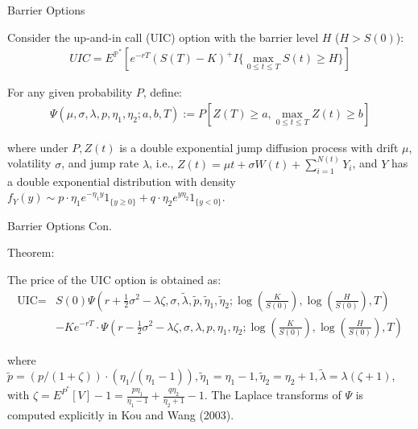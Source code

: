\documentclass{beamer}
\begin{document}
\begin{frame}{Barrier Options}


    {\footnotesize \footnotesize
    \par Consider the up-and-in call (UIC) option with the barrier level $H$ ($H>S(0)$):
    \vspace{1em}
    \begin{align*}
        UIC = E^{\mathbb{P}^*}[e^{-rT}(S(T) - K)^+I{\{ \max\limits_{0 \leq t \leq T} S(t) \geq H \}}]
    \end{align*}
    \vspace{1em}
    \par  \pause For any given probability \( P \), define:
    \vspace{1em}
    \begin{align*}
        \Psi(\mu, \sigma, \lambda, p, \eta_1, \eta_2; a, b, T):= P[Z(T) \geq a, \max_{0 \leq t \leq T} Z(t) \geq b]
    \end{align*}
    \vspace{1em}
    \par  \pause where under \( P, Z(t) \) is a double exponential jump diffusion 
    process with drift \( \mu \), volatility \( \sigma \), and jump rate \( \lambda \), i.e., \( Z(t) = \mu t + \sigma W(t) + \sum_{i=1}^{N(t)} Y_i \), 
    and \( Y \) has a double exponential distribution with 
    density \( f_Y(y) \sim p \cdot \eta_1 e^{-\eta_1 y} 1_{\{y \geq 0\}} + q \cdot \eta_2 e^{y \eta_2} 1_{\{y < 0\}} \).
    }
    
    
\end{frame}
\begin{frame}{Barrier Options Con.}

    \par Theorem:
    \vspace{1em}
    {\footnotesize \footnotesize
    
    \par The price of the UIC option is obtained as:
    \vspace{1em}
    \begin{align*}
        \text{UIC} = & S(0) \Psi \left( r + \frac{1}{2} \sigma^2 - \lambda \zeta, \sigma, \tilde{\lambda}, \tilde{p}, \tilde{\eta}_1, \tilde{\eta}_2; \right. 
        \left. \log \left( \frac{K}{S(0)} \right), \log \left( \frac{H}{S(0)} \right), T \right) \\
        & -Ke^{-rT} \cdot \Psi \left( r - \frac{1}{2} \sigma^2 - \lambda \zeta, \sigma, \lambda, p, \eta_1, \eta_2; \right. 
         \left. \log \left( \frac{K}{S(0)} \right), \log \left( \frac{H}{S(0)} \right), T \right)
    \end{align*}
    \vspace{1em}
    \par  \pause where \( \tilde{p} = (p/(1 + \zeta)) \cdot (\eta_1 / (\eta_1 - 1)), \tilde{\eta}_1 
    = \eta_1 - 1, \tilde{\eta}_2 = \eta_2 + 1, \tilde{\lambda} = \lambda(\zeta + 1) \), 
    with \(\zeta = E^{P^*}[V] - 1 = \frac{p\eta_{1}}{\eta_{1}-1} + \frac{q\eta_{2}}{\eta_{2}+1} - 1\). 
    The Laplace transforms of \( \Psi \) is computed explicitly in Kou and Wang (2003).
    }
    
\end{frame}
\end{document}

